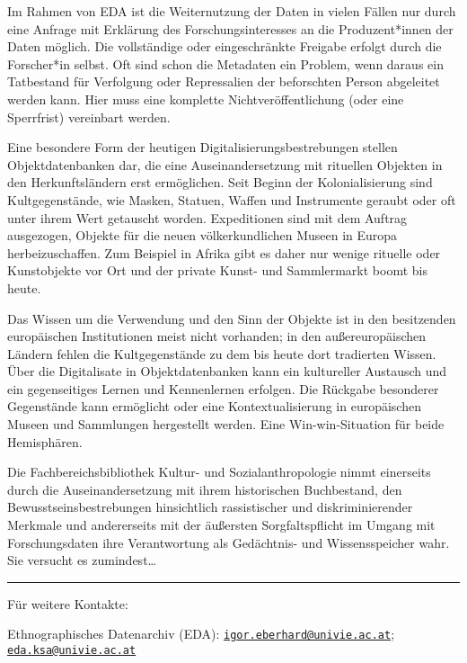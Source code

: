 \documentclass[a4paper,
fontsize=11pt,
oneside,
numbers=noperiodatend,
parskip=half-,
bibliography=totoc,
final
]{scrartcl}
\begin{document}
Im Rahmen von EDA ist die Weiternutzung der Daten in vielen Fällen nur
durch eine Anfrage mit Erklärung des Forschungsinteresses an die
Produzent*innen der Daten möglich. Die vollständige oder eingeschränkte
Freigabe erfolgt durch die Forscher*in selbst. Oft sind schon die
Metadaten ein Problem, wenn daraus ein Tatbestand für Verfolgung oder
Repressalien der beforschten Person abgeleitet werden kann. Hier muss
eine komplette Nichtveröffentlichung (oder eine Sperrfrist) vereinbart
werden.

Eine besondere Form der heutigen Digitalisierungsbestrebungen stellen
Objektdatenbanken dar, die eine Auseinandersetzung mit rituellen
Objekten in den Herkunftsländern erst ermöglichen. Seit Beginn der
Kolonialisierung sind Kultgegenstände, wie Masken, Statuen, Waffen und
Instrumente geraubt oder oft unter ihrem Wert getauscht worden.
Expeditionen sind mit dem Auftrag ausgezogen, Objekte für die neuen
völkerkundlichen Museen in Europa herbeizuschaffen. Zum Beispiel in
Afrika gibt es daher nur wenige rituelle oder Kunstobjekte vor Ort und
der private Kunst- und Sammlermarkt boomt bis heute.

Das Wissen um die Verwendung und den Sinn der Objekte ist in den
besitzenden europäischen Institutionen meist nicht vorhanden; in den
außereuropäischen Ländern fehlen die Kultgegenstände zu dem bis heute
dort tradierten Wissen. Über die Digitalisate in Objektdatenbanken kann
ein kultureller Austausch und ein gegenseitiges Lernen und Kennenlernen
erfolgen. Die Rückgabe besonderer Gegenstände kann ermöglicht oder eine
Kontextualisierung in europäischen Museen und Sammlungen hergestellt
werden. Eine Win-win-Situation für beide Hemisphären.

Die Fachbereichsbibliothek Kultur- und Sozialanthropologie nimmt
einerseits durch die Auseinandersetzung mit ihrem historischen
Buchbestand, den Bewusstseinsbestrebungen hinsichtlich rassistischer und
diskriminierender Merkmale und andererseits mit der äußersten
Sorgfaltspflicht im Umgang mit Forschungsdaten ihre Verantwortung als
Gedächtnis- und Wissensspeicher wahr. Sie versucht es zumindest\ldots{}

\begin{center}\rule{0.5\linewidth}{0.5pt}\end{center}

Für weitere Kontakte:

Ethnographisches Datenarchiv (EDA):
\href{mailto:igor.eberhard@univie.ac.at}{\nolinkurl{igor.eberhard@univie.ac.at}};
\href{mailto:eda.ksa@univie.ac.at}{\nolinkurl{eda.ksa@univie.ac.at}}
\end{document}
